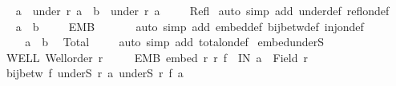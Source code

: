 \begin{isabellebody}
\ \ \ \isamarkupfalse%
\ {\isachardoublequoteopen}a\ {\isasymin}\ under\ r\ a\ {\isasymand}\ b\ {\isasymin}\ under\ r\ a{\isachardoublequoteclose}\isanewline
\ \ \ \isamarkupfalse%
\ Refl\ \isamarkupfalse%
{\isacharparenleft}{\kern0pt}auto\ simp\ add{\isacharcolon}{\kern0pt}\ under{\isacharunderscore}{\kern0pt}def\ refl{\isacharunderscore}{\kern0pt}on{\isacharunderscore}{\kern0pt}def{\isacharparenright}{\kern0pt}\isanewline
\ \ \ \isamarkupfalse%
\ {\isachardoublequoteopen}a\ {\isacharequal}{\kern0pt}\ b{\isachardoublequoteclose}\isanewline
\ \ \ \isamarkupfalse%
\ EMB\ {}\ {\isacharasterisk}{\kern0pt}{\isacharasterisk}{\kern0pt}{\isacharasterisk}{\kern0pt}\isanewline
\ \ \ \isamarkupfalse%
\ {\isacharparenleft}{\kern0pt}auto\ simp\ add{\isacharcolon}{\kern0pt}\ embed{\isacharunderscore}{\kern0pt}def\ bij{\isacharunderscore}{\kern0pt}betw{\isacharunderscore}{\kern0pt}def\ inj{\isacharunderscore}{\kern0pt}on{\isacharunderscore}{\kern0pt}def{\isacharparenright}{\kern0pt}\isanewline
\ \ \isacommand{{\isacharbraceright}{\kern0pt}}\isamarkupfalse%
\isanewline
\ \ \isamarkupfalse%
\isanewline
\ \ \isamarkupfalse%
\ {\isachardoublequoteopen}a\ {\isacharequal}{\kern0pt}\ b{\isachardoublequoteclose}\ \isamarkupfalse%
\ Total\ {}\isanewline
\ \ \isamarkupfalse%
\ {\isacharparenleft}{\kern0pt}auto\ simp\ add{\isacharcolon}{\kern0pt}\ total{\isacharunderscore}{\kern0pt}on{\isacharunderscore}{\kern0pt}def{\isacharparenright}{\kern0pt}\isanewline
{}\isamarkupfalse%
%
\endisatagproof
{\isafoldproof}%
%
\isadelimproof
\isanewline
%
\endisadelimproof
\isanewline
{}\isamarkupfalse%
\ embed{\isacharunderscore}{\kern0pt}underS{\isacharcolon}{\kern0pt}\isanewline
\ \ \ WELL{\isacharcolon}{\kern0pt}\ {\isachardoublequoteopen}Well{\isacharunderscore}{\kern0pt}order\ r{\isachardoublequoteclose}\ \isanewline
\ \ \ \ EMB{\isacharcolon}{\kern0pt}\ {\isachardoublequoteopen}embed\ r\ r{\isacharprime}{\kern0pt}\ f{\isachardoublequoteclose}\ \ IN{\isacharcolon}{\kern0pt}\ {\isachardoublequoteopen}a\ {\isasymin}\ Field\ r{\isachardoublequoteclose}\isanewline
\ \ \ {\isachardoublequoteopen}bij{\isacharunderscore}{\kern0pt}betw\ f\ {\isacharparenleft}{\kern0pt}underS\ r\ a{\isacharparenright}{\kern0pt}\ {\isacharparenleft}{\kern0pt}underS\ r{\isacharprime}{\kern0pt}\ {\isacharparenleft}{\kern0pt}f\ a{\isacharparenright}{\kern0pt}{\isacharparenright}{\kern0pt}{\isachardoublequoteclose}\isanewline

\end{isabellebody}
